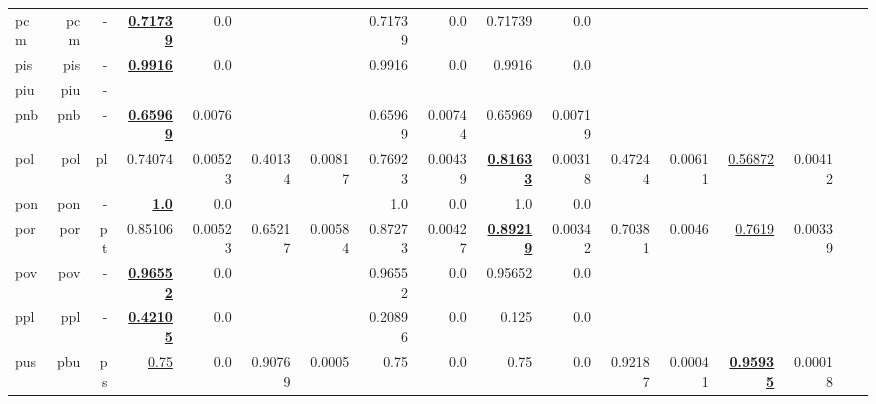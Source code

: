 \documentclass[11pt]{article}
\begin{document}
\begin{table*}[h]
{\begin{tabular}{lrrrrrrrrrrrrrrrr}
pcm         & pcm         & -         & \textbf{\underline{0.71739}}         & 0.0         &          &          & 0.71739         & 0.0         & 0.71739         & 0.0         &          &          &          &          \\
pis         & pis         & -         & \textbf{\underline{0.9916}}         & 0.0         &          &          & 0.9916         & 0.0         & 0.9916         & 0.0         &          &          &          &          \\
piu         & piu         & -         &          &          &          &          &          &          &          &          &          &          &          &          \\
pnb         & pnb         & -         & \textbf{\underline{0.65969}}         & 0.0076         &          &          & 0.65969         & 0.00744         & 0.65969         & 0.00719         &          &          &          &          \\
pol         & pol         & pl         & 0.74074         & 0.00523         & 0.40134         & 0.00817         & 0.76923         & 0.00439         & \textbf{\underline{0.81633}}         & 0.00318         & 0.47244         & 0.00611         & \underline{0.56872}         & 0.00412         \\
pon         & pon         & -         & \textbf{\underline{1.0}}         & 0.0         &          &          & 1.0         & 0.0         & 1.0         & 0.0         &          &          &          &          \\
por         & por         & pt         & 0.85106         & 0.00523         & 0.65217         & 0.00584         & 0.87273         & 0.00427         & \textbf{\underline{0.89219}}         & 0.00342         & 0.70381         & 0.0046         & \underline{0.7619}         & 0.00339         \\
pov         & pov         & -         & \textbf{\underline{0.96552}}         & 0.0         &          &          & 0.96552         & 0.0         & 0.95652         & 0.0         &          &          &          &          \\
ppl         & ppl         & -         & \textbf{\underline{0.42105}}         & 0.0         &          &          & 0.20896         & 0.0         & 0.125         & 0.0         &          &          &          &          \\
pus         & pbu         & ps         & \underline{0.75}         & 0.0         & 0.90769         & 0.0005         & 0.75         & 0.0         & 0.75         & 0.0         & 0.92187         & 0.00041         & \textbf{\underline{0.95935}}         & 0.00018         \\

\end{tabular}}
\end{table*}
\end{document}
